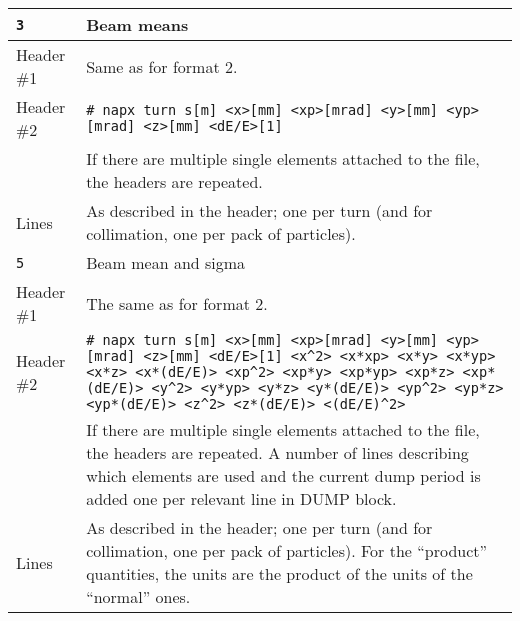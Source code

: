 \begin{center}
\begin{longtable}{|p{1.8cm}|p{13.8cm}|}
        \rowcolor{blue!15}
        \texttt{3} & Beam means \\
        \hline
        Header \#1 & Same as for format 2. \\
        \hline
        Header \#2 & \texttt{\# napx turn s[m] <x>[mm] <xp>[mrad] <y>[mm] <yp>[mrad] <z>[mm] <dE/E>[1]}\vspace{1mm} \\
                   & If there are multiple single elements attached to the file, the headers are repeated.\\
        \hline
        Lines      & As described in the header; one per turn (and for collimation, one per pack of particles). \\
        \hline
        
        \rowcolor{blue!15}
        \texttt{5} & Beam mean and sigma \\
        \hline
        Header \#1 & The same as for format 2.\\
        \hline
        Header \#2 & \texttt{\# napx turn s[m] <x>[mm] <xp>[mrad] <y>[mm] <yp>[mrad] <z>[mm] <dE/E>[1] <x\^{}2> <x*xp> <x*y> <x*yp> <x*z> <x*(dE/E)> <xp\^{}2> <xp*y> <xp*yp> <xp*z> <xp*(dE/E)> <y\^{}2> <y*yp> <y*z> <y*(dE/E)> <yp\^{}2> <yp*z> <yp*(dE/E)> <z\^{}2> <z*(dE/E)> <(dE/E)\^{}2>}\vspace{1mm} \\
                   & If there are multiple single elements attached to the file, the headers are repeated. A number of lines describing which elements are used and the current dump period is added one per relevant line in DUMP block.\\
        \hline
        Lines      & As described in the header; one per turn (and for collimation, one per pack of particles). For the ``product'' quantities, the units are the product of the units of the ``normal'' ones. \\
        \hline
        

\end{longtable}
\end{center}
